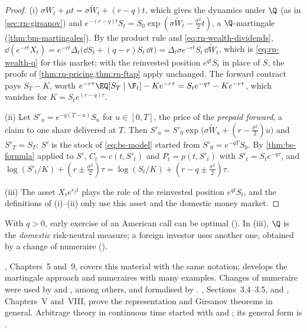 \begin{proof}
(i) $\sigma W_t+\mu t=\sigma\widetilde W_t+(r-q)t$, which gives the dynamics under $\Q$ (as in
\cref{sec:rn-girsanov}) and $e^{-(r-q)t}S_t=S_0\exp(\sigma\widetilde W_t-\frac{\sigma^2}2t)$, a
$\Q$-martingale (\cref{thm:bm-martingales}). By the product rule and
\eqref{eq:rn-wealth-dividends},
$\dd(e^{-rt}X_t)=e^{-rt}\Delta_t\big(\dd S_t+(q-r)S_t\,\dd t\big)=\Delta_t\sigma e^{-rt}S_t\,\dd\widetilde W_t$,
which is \eqref{eq:rn-wealth-q} for this market; with the reinvested position $e^{qt}S_t$ in
place of $S$, the proofs of \cref{thm:rn-pricing,thm:rn-ftap} apply unchanged. The forward contract pays $S_T-K$, worth $e^{-r\tau}\EQ[S_T\mid\F_t]-Ke^{-r\tau}
=S_te^{-q\tau}-Ke^{-r\tau}$, which vanishes for $K=S_te^{(r-q)\tau}$.

(ii) Let $S'_u=e^{-q(T-u)}S_u$ for $u\in[0,T]$, the price of the \emph{prepaid forward}, a claim
to one share delivered at $T$. Then $S'_u=S'_0\exp\big(\sigma\widetilde W_u+(r-\frac{\sigma^2}2)u\big)$
and $S'_T=S_T$: $S'$ is the stock of \eqref{eq:bs-model} started from $S'_0=e^{-qT}S_0$. By
\cref{thm:bs-formula} applied to $S'$, $C_t=c(t,S'_t)$ and $P_t=p(t,S'_t)$ with
$S'_t=S_te^{-q\tau}$, and $\log(S'_t/K)+(r\pm\frac{\sigma^2}2)\tau=\log(S_t/K)+(r-q\pm\frac{\sigma^2}2)\tau$.

(iii) The asset $X_te^{r_ft}$ plays the role of the reinvested position $e^{qt}S_t$, and the
definitions of (i)--(ii) only use this asset and the domestic money market.
\end{proof}

With $q>0$, early exercise of an American call can be optimal (). In
(iii), $\Q$ is the \emph{domestic} risk-neutral measure; a foreign investor uses another one,
obtained by a change of numeraire ().

\furtherreading
\textcite{shreve2}, Chapters~5 and~9, covers this material with the same notation;
\textcite{bjork-arbitrage} develops the martingale approach and numeraires with many examples.
Changes of numeraire were used by \textcite{margrabe-exchange} and
\textcite{jamshidian-bond-option}, among others, and formalised by
\textcite{geman-elkaroui-rochet-1995}. \textcite{karatzas-shreve}, Sections~3.4--3.5, and
\textcite{revuz-yor}, Chapters~V and~VIII, prove the representation and Girsanov theorems in
general. Arbitrage theory in continuous time started with \textcite{harrison-kreps-1979} and
\textcite{harrison-pliska}; its general form is \textcite{delbaen-schachermayer-1994}.
